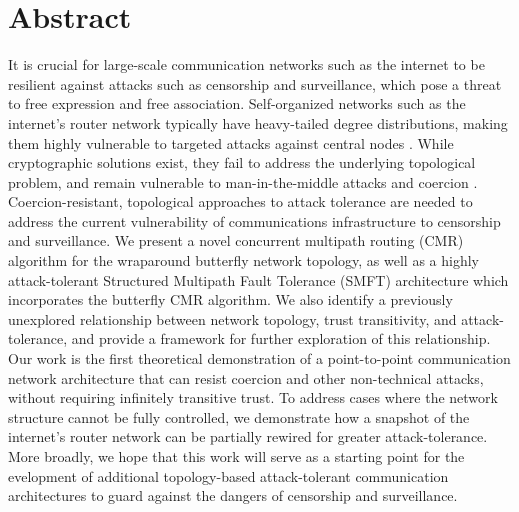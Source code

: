 \documentclass[10pt,letterpaper]{article}
\begin{document}
\section*{Abstract}
It is crucial for large-scale communication networks such as the internet
to be resilient against attacks\cite{sterbenz_resilience_2010}
such as censorship and surveillance,
which pose a threat to free expression and free association.
Self-organized networks such as the internet’s router network typically have
heavy-tailed degree distributions\cite{barabasi_scale-free_2009},
making them highly vulnerable to targeted attacks against central nodes
\cite{albert_error_2000}.
While cryptographic solutions exist,
they fail to address the underlying topological problem,
and remain vulnerable to
man-in-the-middle attacks \cite{nayak_different_2010}
and coercion \cite{grewal_caveat_2013}.
Coercion-resistant, topological approaches to attack tolerance are needed to
address the current vulnerability of communications infrastructure to
censorship and surveillance.
We present a novel concurrent multipath routing (CMR) algorithm for the
wraparound butterfly network topology,
as well as a highly attack-tolerant Structured Multipath Fault Tolerance (SMFT)
architecture which incorporates the butterfly CMR algorithm. We also identify a
previously unexplored relationship between network topology, trust transitivity,
and attack-tolerance, and provide a framework for further exploration of this
relationship. Our work is the first theoretical demonstration of a point-to-point
communication network architecture that can resist coercion and other
non-technical attacks, without requiring infinitely transitive trust.
To address cases where the network structure cannot be fully controlled,
we demonstrate how a snapshot of the internet’s router network can be partially
rewired for greater attack-tolerance.
More broadly, we hope that this work will serve as a starting point for the
evelopment of additional topology-based attack-tolerant communication
architectures to guard against the dangers of censorship and surveillance.

\end{document}
